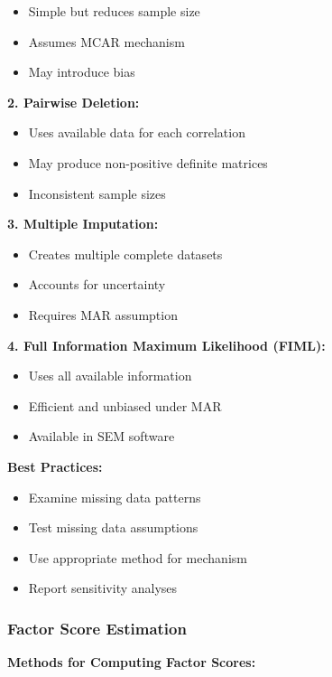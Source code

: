 \documentclass[
]{article}
\begin{document}
\begin{itemize}
\item
  Simple but reduces sample size
\item
  Assumes MCAR mechanism
\item
  May introduce bias
\end{itemize}

\textbf{2. Pairwise Deletion:}

\begin{itemize}
\item
  Uses available data for each correlation
\item
  May produce non-positive definite matrices
\item
  Inconsistent sample sizes
\end{itemize}

\textbf{3. Multiple Imputation:}

\begin{itemize}
\item
  Creates multiple complete datasets
\item
  Accounts for uncertainty
\item
  Requires MAR assumption
\end{itemize}

\textbf{4. Full Information Maximum Likelihood (FIML):}

\begin{itemize}
\item
  Uses all available information
\item
  Efficient and unbiased under MAR
\item
  Available in SEM software
\end{itemize}

\textbf{Best Practices:}

\begin{itemize}
\item
  Examine missing data patterns
\item
  Test missing data assumptions
\item
  Use appropriate method for mechanism
\item
  Report sensitivity analyses
\end{itemize}

\subsubsection{Factor Score Estimation}

\textbf{Methods for Computing Factor Scores:}
\end{document}
